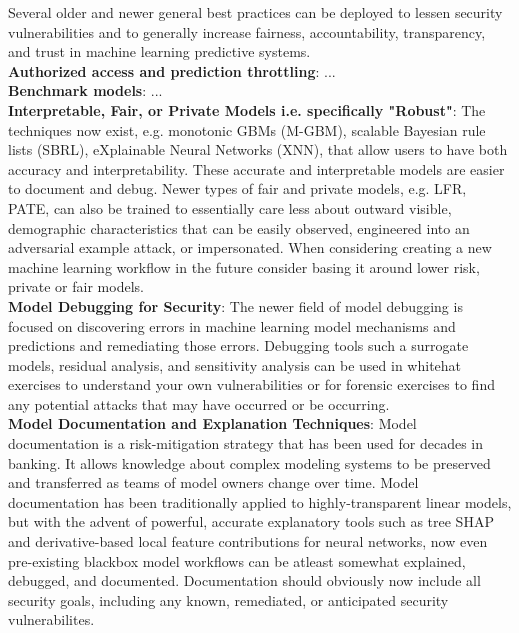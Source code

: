 \documentclass[fleqn]{article}
\begin{document}
Several older and newer general best practices can be deployed to lessen security vulnerabilities and to generally increase fairness, accountability, transparency, and trust in machine learning predictive systems.\\ 

\noindent\textbf{Authorized access and prediction throttling}: ...\\

\noindent\textbf{Benchmark models}: ...\\

\noindent\textbf{Interpretable, Fair, or Private Models i.e. specifically "Robust"}: The techniques now exist, e.g. monotonic GBMs (M-GBM), scalable Bayesian rule lists (SBRL), eXplainable Neural Networks (XNN), that allow users to have both accuracy and interpretability. These accurate and interpretable models are easier to document and debug. Newer types of fair and private models, e.g. LFR, PATE, can also be trained to essentially care less about outward visible, demographic characteristics that can be easily observed, engineered into an adversarial example attack, or impersonated. When considering creating a new machine learning workflow in the future consider basing it around lower risk, private or fair models.\\

\noindent\textbf{Model Debugging for Security}: The newer field of model debugging is focused on discovering errors in machine learning model mechanisms and predictions and remediating those errors. Debugging tools such a surrogate models, residual analysis, and sensitivity analysis can be used in whitehat exercises to understand your own vulnerabilities or for forensic exercises to find any potential attacks that may have occurred or be occurring.\\

\noindent\textbf{Model Documentation and Explanation Techniques}: Model documentation is a risk-mitigation strategy that has been used for decades in banking. It allows knowledge about complex modeling systems to be preserved and transferred as teams of model owners change over time. Model documentation has been traditionally applied to highly-transparent linear models, but with the advent of powerful, accurate explanatory tools such as tree SHAP and derivative-based local feature contributions for neural networks, now even pre-existing blackbox model workflows can be atleast somewhat explained, debugged, and documented. Documentation should obviously now include all security goals, including any known, remediated, or anticipated security vulnerabilites.\\
\end{document}
